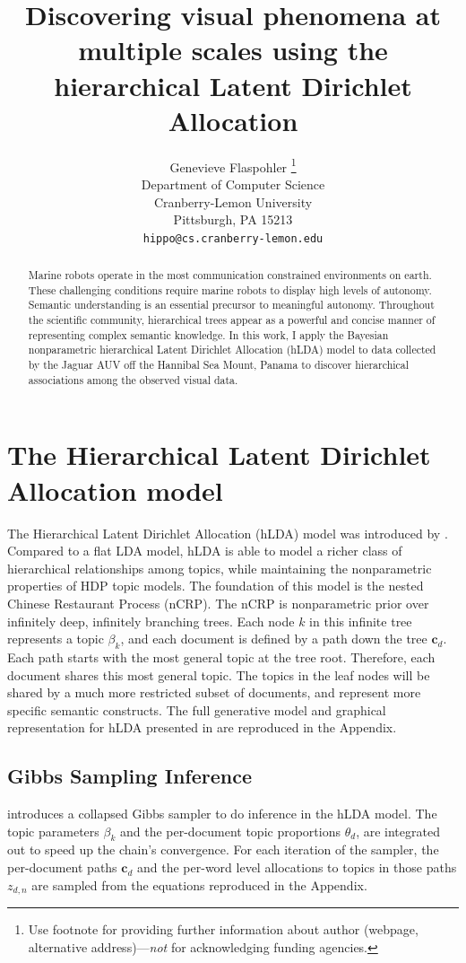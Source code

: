 \documentclass{article}
\title{Discovering visual phenomena at multiple scales using the hierarchical Latent Dirichlet Allocation}
\author{
  Genevieve Flaspohler \thanks{Use footnote for providing further
    information about author (webpage, alternative
    address)---\emph{not} for acknowledging funding agencies.} \\
  Department of Computer Science\\
  Cranberry-Lemon University\\
  Pittsburgh, PA 15213 \\
  \texttt{hippo@cs.cranberry-lemon.edu} \\
}
\begin{document}
\maketitle

\begin{abstract}
Marine robots operate in the most communication constrained environments on earth. These challenging conditions require marine robots to display high levels of autonomy. Semantic understanding is an essential precursor to meaningful autonomy. Throughout the scientific community, hierarchical trees appear as a powerful and concise manner of representing complex semantic knowledge. In this work, I apply the Bayesian nonparametric hierarchical Latent Dirichlet Allocation (hLDA) model to data collected by the Jaguar AUV off the Hannibal Sea Mount, Panama to discover hierarchical associations among the observed visual data. 
\end{abstract}

\section{The Hierarchical Latent Dirichlet Allocation model}
  The Hierarchical Latent Dirichlet Allocation (hLDA) model was introduced by \citet{Blei2010}. Compared to a flat LDA model, hLDA is able to model a richer class of hierarchical relationships among topics, while maintaining the nonparametric properties of HDP topic models. The foundation of this model is the nested Chinese Restaurant Process (nCRP). The nCRP is nonparametric prior over infinitely deep, infinitely branching trees. Each node $k$ in this infinite tree represents a topic $\beta_k$, and each document is defined by a path down the tree $\mathbf{c}_d$. Each path starts with the most general topic at the tree root. Therefore, each document shares this most general topic. The topics in the leaf nodes will be shared by a much more restricted subset of documents, and represent more specific semantic constructs. The full generative model and graphical representation for hLDA presented in \citet{Blei2010} are reproduced in the Appendix.

\subsection{Gibbs Sampling Inference}
\citet{Blei2010} introduces a collapsed Gibbs sampler to do inference in the hLDA model. The topic parameters $\beta_k$ and the per-document topic proportions $\theta_d$, are integrated out to speed up the chain's convergence. For each iteration of the sampler, the per-document paths $\mathbf{c}_d$ and the per-word level allocations to topics in those paths $z_{d,n}$ are sampled from the equations reproduced in the Appendix. 
\end{document}
